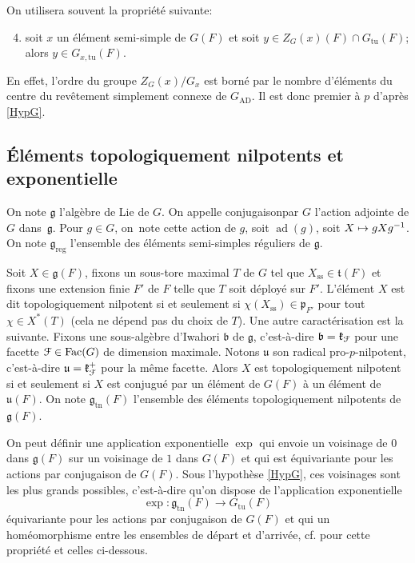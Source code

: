\documentclass[11pt]{article}
\newcommand{\cf}{cf.\xspace}
\numberwithin{equation}{section}\providecommand{\og}{«\,}\providecommand{\fg}{\,»}
\let\mathcal \EuScript
\newcommand\mto{\mathchoice{\longmapsto}{\mapsto}{\mapsto}{\mapsto}}
\newcommand{\frb}{\mathfrak{b}}
\newcommand{\frg}{\mathfrak{g}}
\newcommand{\frk}{\mathfrak{k}}
\newcommand{\frp}{\mathfrak{p}}
\newcommand{\frt}{\mathfrak{t}}
\newcommand{\fru}{\mathfrak{u}}
\newcommand{\AD}{\mathrm{AD}}
\newcommand{\Fac}{\mathrm{Fac}}
\newcommand{\reg}{\mathrm{reg}}
\newcommand{\rss}{\mathrm{ss}}
\newcommand{\tn}{\mathrm{tn}}
\newcommand{\tu}{\mathrm{tu}}
\DeclareMathOperator{\ad}{ad}
\newcommand{\cF}{\mathcal{F}}
\theoremstyle{plain}
\theoremstyle{definition}
\begin{document}
On utilisera souvent la propriété suivante:

\begin{enumerate}\setcounter{enumi}{3}
\item\label{retour4}
soit $x$ un élément semi-simple de $G(F)$ et soit $y\in Z_{G}(x)(F)\cap G_{\tu}(F)$; alors $y\in G_{x,\tu}(F)$.
\end{enumerate}

En effet, l'ordre du groupe $Z_{G}(x)/G_{x}$ est borné par le nombre d'éléments du centre du revêtement simplement connexe de $G_{\AD}$. Il est donc premier à $p$ d'après \ref{HypG}.

\subsection{Éléments topologiquement nilpotents et exponentielle}\label{elementstopologiquement}
On note $\frg$ l'algèbre de Lie de $G$. On appelle \og conjugaison\fg par $G$ l'action adjointe de $G$ dans~$\frg$. Pour $g\in G$, on~note cette action de $g$, soit $\ad(g)$, soit $X\mto gXg^{-1}$. On note $\frg_{\reg}$ l'ensemble des éléments semi-simples réguliers de $\frg$.

Soit $X\in \frg(F)$, fixons un sous-tore maximal $T$ de $G$ tel que $X_{\rss}\in \frt(F)$ et fixons une extension finie $F'$ de $F$ telle que $T$ soit déployé sur $F'$. L'élément $X$ est dit topologiquement nilpotent si et seulement si $ \chi(X_{\rss})\in \frp_{F'}$ pour tout $\chi\in X^*(T)$ (cela ne dépend pas du choix de $T$). Une autre caractérisation est la suivante. Fixons une sous-algèbre d'Iwahori $\frb$ de $\frg$, c'est-à-dire $\frb=\frk_{\cF}$ pour une facette $\cF\in \Fac(G)$ de dimension maximale. Notons $\fru$ son radical pro-$p$-nilpotent, c'est-à-dire $\fru=\frk_{\cF}^+$ pour la même facette. Alors $X$ est topologiquement nilpotent si et seulement si $X$ est conjugué par un élément de $G(F)$ à un élément de $\fru(F)$. On note $\frg_{\tn}(F)$ l'ensemble des éléments topologiquement nilpotents de $\frg(F)$.

On peut définir une application exponentielle $\exp$ qui envoie un voisinage de $0$ dans $\frg(F)$ sur un voisinage de $1$ dans $G(F)$ et qui est équivariante pour les actions par conjugaison de $G(F)$. Sous l'hypothèse \ref{HypG}, ces voisinages sont les plus grands possibles, c'est-à-dire qu'on dispose de l'application exponentielle
\[
\exp:\frg_{\tn}(F)\to G_{\tu}(F)
\]
équivariante pour les actions par conjugaison de $G(F)$ et qui
un homéomorphisme entre les ensembles de départ et d'arrivée, \cf \cite[App.\,B]{DR} pour cette propriété et celles ci-dessous.
\end{document}
